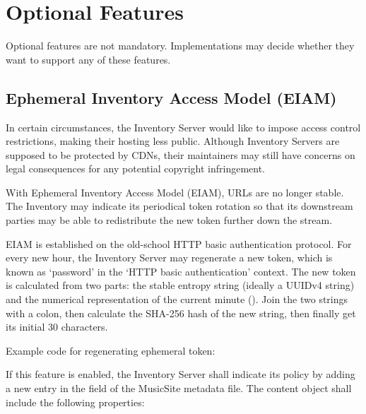 \documentclass[a4paper,11pt]{article}
\begin{document}







\section{Optional Features}

Optional features are not mandatory. Implementations may decide whether they want to support any of these features.

\subsection{Ephemeral Inventory Access Model (EIAM)}

In certain circumstances, the Inventory Server would like to impose access control restrictions, making their hosting less public. Although Inventory Servers are supposed to be protected by CDNs, their maintainers may still have concerns on legal consequences for any potential copyright infringement.

With Ephemeral Inventory Access Model (EIAM), URLs are no longer stable. The Inventory may indicate its periodical token rotation so that its downstream parties may be able to redistribute the new token further down the stream.

EIAM is established on the old-school HTTP basic authentication protocol. For every new hour, the Inventory Server may regenerate a new token, which is known as `password' in the `HTTP basic authentication' context. The new token is calculated from two parts: the stable entropy string (ideally a UUIDv4 string) and the numerical representation of the current minute (). Join the two strings with a colon, then calculate the SHA-256 hash of the new string, then finally get its initial 30 characters.

Example code for regenerating ephemeral token:


If this feature is enabled, the Inventory Server shall indicate its policy by adding a new entry in the  field of the MusicSite metadata file. The content object shall include the following properties:
\end{document}
